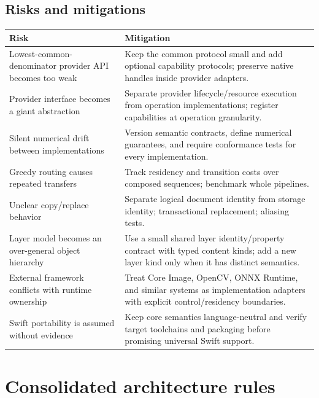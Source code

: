 \documentclass[11pt,a4paper,oneside]{article}
\begin{document}
\subsection{Risks and mitigations}

\begin{longtable}{@{}L{0.25\textwidth}Z{0.69\textwidth}@{}}
\toprule
\textbf{Risk} & \textbf{Mitigation} \\
\midrule
Lowest-common-denominator provider API becomes too weak & Keep the common protocol small and add optional capability protocols; preserve native handles inside provider adapters. \\
Provider interface becomes a giant abstraction & Separate provider lifecycle/resource execution from operation implementations; register capabilities at operation granularity. \\
Silent numerical drift between implementations & Version semantic contracts, define numerical guarantees, and require conformance tests for every implementation. \\
Greedy routing causes repeated transfers & Track residency and transition costs over composed sequences; benchmark whole pipelines. \\
Unclear copy/replace behavior & Separate logical document identity from storage identity; transactional replacement; aliasing tests. \\
Layer model becomes an over-general object hierarchy & Use a small shared layer identity/property contract with typed content kinds; add a new layer kind only when it has distinct semantics. \\
External framework conflicts with runtime ownership & Treat Core Image, OpenCV, ONNX Runtime, and similar systems as implementation adapters with explicit control/residency boundaries. \\
Swift portability is assumed without evidence & Keep core semantics language-neutral and verify target toolchains and packaging before promising universal Swift support. \\
\bottomrule
\end{longtable}

\section{Consolidated architecture rules}
\end{document}
